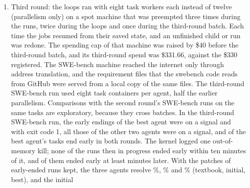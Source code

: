\begin{enumerate}
cores). Load was sampled every minute over the whole run in \vloadFullPct\% of runs and over part of it in
\vloadPartPct\%, and interpolated from checks every 30 minutes for the rest, including \vloadMovesApprox{} of the
textbook agent's 293 runs. By load tertile (low, middle, high), the
early-ending rates were: initial agent \vearlyInitLo, \vearlyInitMid{} and \vearlyInitHi\%; best agent \vearlyBestLo,
\vearlyBestMid{} and \vearlyBestHi\%; textbook agent \vearlyMovesLo, \vearlyMovesMid{} and \vearlyMovesHi\%; retry
variant \vearlyRetryLo, \vearlyRetryMid{} and \vearlyRetryHi\%. The resolve rate of the textbook agent fell from
\vresMovesLo\% to \vresMovesHi\%, which works against it. The tertiles are formed per
agent and are confounded with run order, so these figures do not rule out an effect of load. In the third round the
one-minute load average stayed below \wLoadMax{} (in the second round it reached \wvLoadMax), and the best agent still
ended \wBestEarly{} of \wN{} runs early, compared with \wvBestEarly{} on the same tasks in the second round (\S\ref{sec:swe-equal}).
\item Third round: the loops ran with eight task workers each instead of twelve (parallelism only) on a spot machine
that was preempted three times during the runs, twice during the loops and once during the third-round batch. Each time the
jobs resumed from their saved state, and an unfinished child or run was redone. The spending cap of that machine was
raised by \$40 before the third-round batch, and its third-round spend was \$331.66, against the \$330 registered. The
SWE-bench machine reached the internet only through address translation, and the requirement files that the swebench
code reads from GitHub were served from a local copy of the same files. The third-round SWE-bench run used eight task containers per agent,
half the earlier parallelism. Comparisons with the second round's SWE-bench runs on the same tasks are exploratory, because they cross
batches. In the third-round SWE-bench run, the early endings of the best agent were \wBestEarlySig{} on a signal and \wBestEarlyOne{} with exit code 1,
all those of the other two agents were on a signal, and \wBestEarlyBoth{} of the best agent's tasks end early in both rounds.
The kernel logged one out-of-memory kill; none of the \wOomInProg{} runs then in progress ended early within ten minutes of
it, and \wOomEarlyLater{} of them ended early at least \wOomGapMin{} minutes later. With the patches of early-ended runs
kept, the three agents resolve \wMovesKept\%, \wInitKept\% and \wBestKept\% (textbook, initial, best), and the initial

\end{enumerate}
